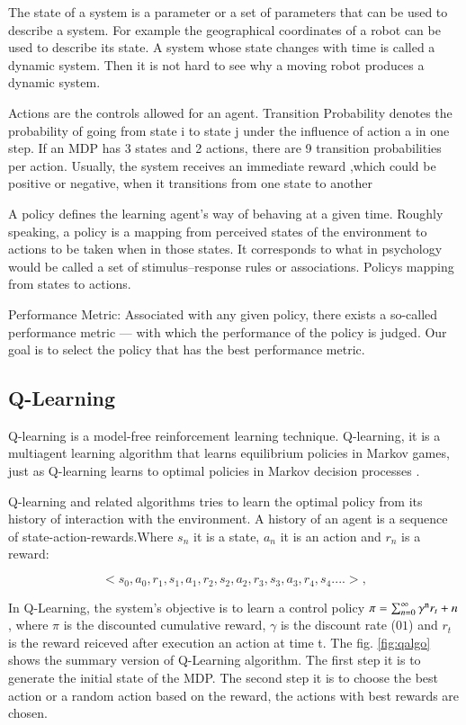 The state of a system is a parameter or a set of parameters that can be used to describe a system. For example the geographical coordinates of a robot can be used to
describe its state. A system whose state changes with time is called a dynamic system. Then it is not hard to see why a moving robot produces a dynamic system.

Actions are the controls allowed for an agent. Transition Probability denotes the probability of going from state i to state j under the influence of action a in one step. If an MDP has 3 states and 2 actions, there are 9 transition probabilities per action. Usually, the system receives an immediate reward ,which could be positive or negative, when it transitions from one state to another

A policy defines the learning agent’s way of behaving at a given time. Roughly speaking, a policy is a mapping from perceived states of the environment
to actions to be taken when in those states. It corresponds to what in
psychology would be called a set of stimulus–response rules or associations.  Policys mapping from states to actions.

Performance Metric: Associated with any given policy, there exists a so-called performance
metric — with which the performance of the policy is judged. Our goal is to select the policy
that has the best performance metric. 


\subsection{Q-Learning}

Q-learning is a model-free reinforcement learning technique. Q-learning, it is a multiagent learning algorithm that learns equilibrium policies in Markov games, just as Q-learning learns to optimal policies in Markov decision processes \cite{Greenwald2003}. 

Q-learning and related algorithms tries to learn the optimal policy from its history of interaction with the environment. A history of an agent is a sequence of state-action-rewards.Where $s_{n}$ it is a state, $a_{n}$ it is an action and $r_{n}$ is a reward:

\begin{equation}
<s_{0},a_{0},r_{1},s_{1},a_{1},r_{2},s_{2},a_{2},r_{3},s_{3},a_{3},r_{4},s_{4}....>,
\end{equation}


In Q-Learning, the system's objective is to learn a control policy $\pi = \sum_{n=0}^{\infty} \gamma\textsuperscript{n}  r_{t}+n $, where $\pi$  is the discounted cumulative reward, $\gamma$ is the discount rate ($01$) and $r_{t}$ is the reward reiceved after execution an action at time t. The fig. \ref{fig:qalgo} shows the summary version of Q-Learning algorithm. The first step it is to generate the initial state of the MDP. The second step it is to choose the best action or a random action based on the reward, the actions with best rewards are chosen.


